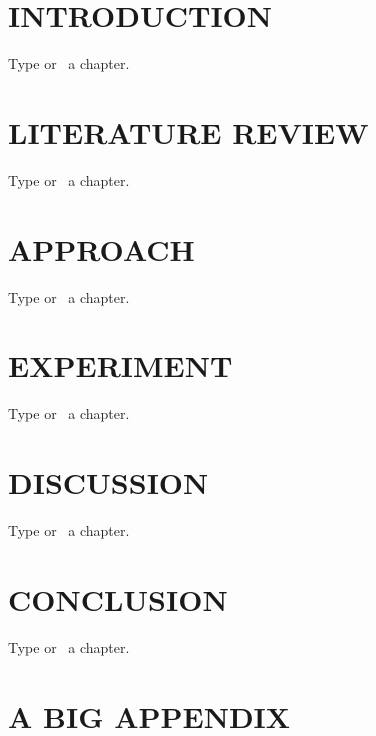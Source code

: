 \documentclass[dissertation]{uathesis}
\author{Joe Somebody}       %
\title{Title of the thesis: the top line should be the longest \and
  the middle one is second longest \and
  and the last is shortest}
\begin{document}
\makefrontmatter


\begin{body}

\chapter{INTRODUCTION}
Type or \ a chapter. \cite{rocket-themoon2167}

\chapter{LITERATURE REVIEW}
Type or \ a chapter. \cite{rocket-themoon2167}

\chapter{APPROACH}
Type or \ a chapter. \cite{rocket-themoon2167}

\chapter{EXPERIMENT}
Type or \ a chapter. \cite{rocket-themoon2167}

\chapter{DISCUSSION}
Type or \ a chapter. \cite{rocket-themoon2167}

\chapter{CONCLUSION}
Type or \ a chapter. \cite{rocket-themoon2167}






\appendix

\chapter{A BIG APPENDIX}

\end{body}
\end{document}
